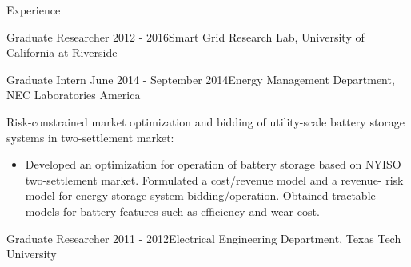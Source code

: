 \documentclass{resume} %
\begin{document}
\begin{rSection}{ Experience}
\begin{rSubsection}{Graduate Researcher}{ 2012 - 2016}{Smart Grid Research Lab, University of California at Riverside}{}
%
%
\end{rSubsection}


\begin{rSubsection}{Graduate Intern }{June 2014 - September 2014}{Energy Management Department, NEC Laboratories America}{}

\item [] Risk-constrained  market optimization and bidding of utility-scale battery storage systems in two-settlement market:

\begin{itemize}
\item []	Developed an optimization for  operation  of battery storage based on NYISO two-settlement market. 
Formulated a cost/revenue model and a revenue- risk model for energy storage system bidding/operation. 
Obtained tractable models for  battery features such as efficiency and wear cost. 
\end{itemize}

\end{rSubsection}


\begin{rSubsection}{Graduate Researcher }{2011 - 2012}{Electrical Engineering Department, Texas Tech University}{}


\end{rSubsection}
\end{rSection}
\end{document}
